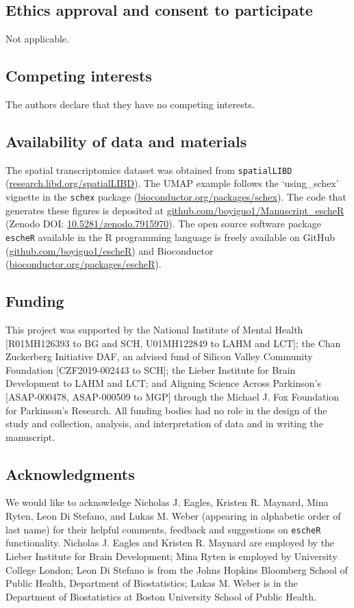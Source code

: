 \documentclass[10pt,twocolumn]{article}
\begin{document}
\subsection*{Ethics approval and consent to participate}
Not applicable.

\subsection*{Competing interests}
The authors declare that they have no competing interests.

\subsection*{Availability of data and materials}
The spatial transcriptomics dataset was obtained from \texttt{spatialLIBD} (\href{http://research.libd.org/spatialLIBD}{research.libd.org/spatialLIBD}). The UMAP example follows the `using\_schex' vignette in the \texttt{schex} package (\href{https://www.bioconductor.org/packages/schex}{bioconductor.org/packages/schex}). The code that generates these figures is deposited at \href{https://github.com/boyiguo1/Manuscript_escheR}{github.com/boyiguo1/Manuscript\_escheR} (Zenodo DOI: \href{https://zenodo.org/record/7915970}{10.5281/zenodo.7915970}). The open source software package \texttt{escheR} available in the R programming language is freely available on GitHub (\href{https://github.com/boyiguo1/escheR}{github.com/boyiguo1/escheR}) and Bioconductor (\href{https://bioconductor.org/packages/escheR}{bioconductor.org/packages/escheR}).


\subsection*{Funding}
This project was supported by the National Institute of Mental Health [R01MH126393 to BG and SCH, U01MH122849 to LAHM and LCT]; the Chan Zuckerberg Initiative DAF, an advised fund of Silicon Valley Community Foundation [CZF2019-002443 to SCH]; the Lieber Institute for Brain Development to LAHM and LCT; and Aligning Science Across Parkinson’s [ASAP-000478, ASAP-000509 to MGP] through the Michael J. Fox Foundation for Parkinson’s Research.  All funding bodies had no role in the design of the study and collection, analysis, and interpretation of data and in writing the manuscript.

\subsection*{Acknowledgments}
We would like to acknowledge Nicholas J. Eagles, Kristen R. Maynard, Mina Ryten, Leon Di Stefano, and Lukas M. Weber (appearing in alphabetic order of last name) for their helpful comments, feedback and suggestions on \texttt{escheR} functionality. Nicholas J. Eagles and Kristen R. Maynard are employed by the Lieber Institute for Brain Development; Mina Ryten is employed by University College London; Leon Di Stefano is from the Johns Hopkins Bloomberg School of Public Health, Department of Biostatistics; Lukas M. Weber is in the Department of Biostatistics at Boston University School of Public Health.  
\end{document}
